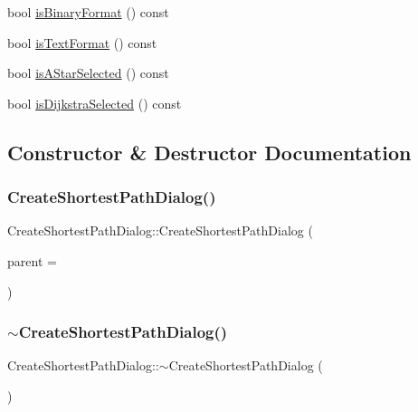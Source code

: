 \begin{DoxyCompactItemize}
\item 
bool \mbox{\hyperlink{class_create_shortest_path_dialog_add75a9c74a723e3e7ebca6978ac90d39}{is\+Binary\+Format}} () const
\item 
bool \mbox{\hyperlink{class_create_shortest_path_dialog_a069aa99329ce552035e42e69e42493e1}{is\+Text\+Format}} () const
\item 
bool \mbox{\hyperlink{class_create_shortest_path_dialog_a098b131658f99ad79f5f06901bd0b9ed}{is\+A\+Star\+Selected}} () const
\item 
bool \mbox{\hyperlink{class_create_shortest_path_dialog_a057be365e2a9931c8d77ab4824fd310e}{is\+Dijkstra\+Selected}} () const
\end{DoxyCompactItemize}


\subsection{Constructor \& Destructor Documentation}
\mbox{\label{class_create_shortest_path_dialog_a4c0847ff271b3b53aff8c4529685cc0b}} 
\subsubsection{\texorpdfstring{CreateShortestPathDialog()}{CreateShortestPathDialog()}}
{\footnotesize\ttfamily Create\+Shortest\+Path\+Dialog\+::\+Create\+Shortest\+Path\+Dialog (\begin{DoxyParamCaption}\item[{Q\+Widget $\ast$}]{parent = {} }\end{DoxyParamCaption})\hspace{0.3cm}{\ttfamily [explicit]}}

\mbox{\label{class_create_shortest_path_dialog_aeb448f0b0a0a2ebe6b38472a0bd7e3a7}} 
\subsubsection{\texorpdfstring{$\sim$CreateShortestPathDialog()}{~CreateShortestPathDialog()}}
{\footnotesize\ttfamily Create\+Shortest\+Path\+Dialog\+::$\sim$\+Create\+Shortest\+Path\+Dialog (\begin{DoxyParamCaption}{ }\end{DoxyParamCaption})}



